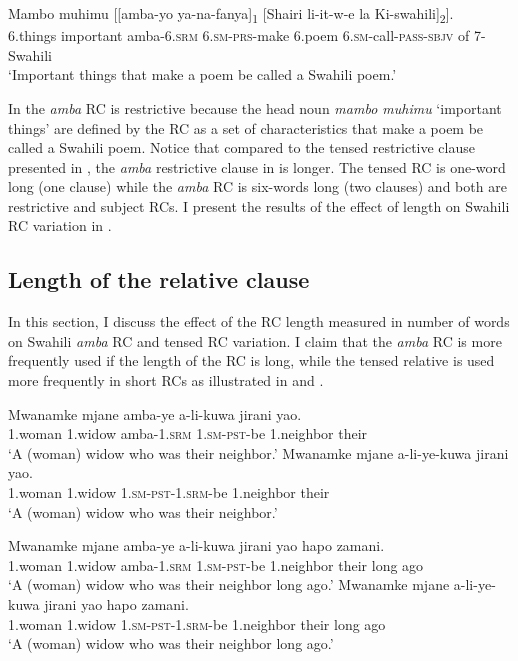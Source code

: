 \documentclass[output=paper,colorlinks,citecolor=brown]{langscibook}
\begin{document}
\ea%
    \label{ex:mwamzandi:18}
    \gll    Mambo muhimu [[amba-yo  ya-na-fanya]\textsubscript{1} [Shairi li-it-w-e la Ki-swahili]\textsubscript{2}].\\
            6.things important amba\textsc{-6.srm} \textsc{6.sm-prs-}make 6.poem  \textsc{6.sm-}call\textsc{-pass-sbjv} of 7-Swahili\\
    \glt    ‘Important things that make a poem be called a Swahili poem.’
\z

In  the \textit{amba} RC is restrictive because the head noun \textit{mambo muhimu} ‘important things’ are defined by the RC as a set of characteristics that make a poem be called a Swahili poem. Notice that compared to the tensed restrictive clause presented in , the \textit{amba} restrictive clause in  is longer. The tensed RC is one-word long (one clause) while the \textit{amba} RC is six-words long (two clauses) and both are restrictive and subject RCs. I present the results of the effect of length on Swahili RC variation in .

\subsection{Length of the relative clause}\label{sec:mwamzandi:4.2}

In this section, I discuss the effect of the RC length measured in number of words on Swahili \textit{amba} RC and tensed RC variation. I claim that the \textit{amba} RC is more frequently used if the length of the RC is long, while the tensed relative is used more frequently in short RCs as illustrated in  and .

\ea%
    \label{ex:mwamzandi:19}
    \ea%
    \label{ex:mwamzandi:19a}
    \gll    Mwanamke mjane amba-ye a-li-kuwa jirani yao.\\
            1.woman 1.widow amba\textsc{-1.srm} \textsc{1.sm-pst-}be 1.neighbor their\\
    \glt    ‘A (woman) widow who was their neighbor.’
    \ex%
    \label{ex:mwamzandi:19b}
    \gll    Mwanamke mjane a-li-ye-kuwa jirani yao.\\
            1.woman  1.widow  \textsc{1.sm-pst-1.srm-}be 1.neighbor their\\
    \glt    ‘A (woman) widow who was their neighbor.’
    \z
\z

\ea%
    \label{ex:mwamzandi:20}
    \ea%
    \label{ex:mwamzandi:20a}
    \gll    Mwanamke mjane amba-ye a-li-kuwa jirani yao hapo zamani.\\
            1.woman  1.widow  amba\textsc{-1.srm} \textsc{1.sm-pst-}be 1.neighbor their long ago\\
    \glt    ‘A (woman) widow who was their neighbor long ago.’
    \ex%
    \label{ex:mwamzandi:20b}
    \gll    Mwanamke mjane a-li-ye-kuwa jirani yao hapo zamani.\\
            1.woman 1.widow \textsc{1.sm-pst-1.srm-}be 1.neighbor their long ago\\
    \glt    ‘A (woman) widow who was their neighbor long ago.’
    \z
\z
\end{document}
